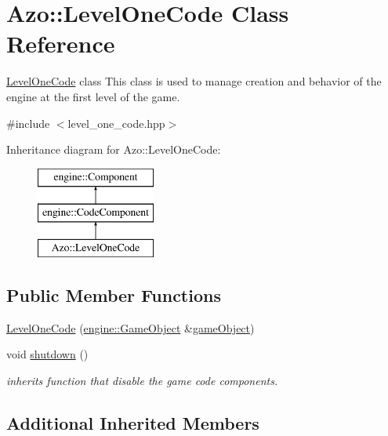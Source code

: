 \hypertarget{class_azo_1_1_level_one_code}{}\section{Azo\+:\+:Level\+One\+Code Class Reference}
\label{class_azo_1_1_level_one_code}


\hyperlink{class_azo_1_1_level_one_code}{Level\+One\+Code} class This class is used to manage creation and behavior of the engine at the first level of the game.  




{\ttfamily \#include $<$level\+\_\+one\+\_\+code.\+hpp$>$}

Inheritance diagram for Azo\+:\+:Level\+One\+Code\+:\begin{figure}[H]
\begin{center}
\leavevmode
\includegraphics[height=3.000000cm]{class_azo_1_1_level_one_code}
\end{center}
\end{figure}
\subsection*{Public Member Functions}
\begin{DoxyCompactItemize}
\item 
\hyperlink{class_azo_1_1_level_one_code_aa35d7bc4e322a0db629dcdbdd60c07ca}{Level\+One\+Code} (\hyperlink{classengine_1_1_game_object}{engine\+::\+Game\+Object} \&\hyperlink{classengine_1_1_component_ad4a4865ca4df98ebea34d04a4ec5ad07}{game\+Object})
\item 
void \hyperlink{class_azo_1_1_level_one_code_af66d92f836d8a6c0f72d718d05db63a5}{shutdown} ()
\begin{DoxyCompactList}\small\item\em inherits function that disable the game code components. \end{DoxyCompactList}\end{DoxyCompactItemize}
\subsection*{Additional Inherited Members}



